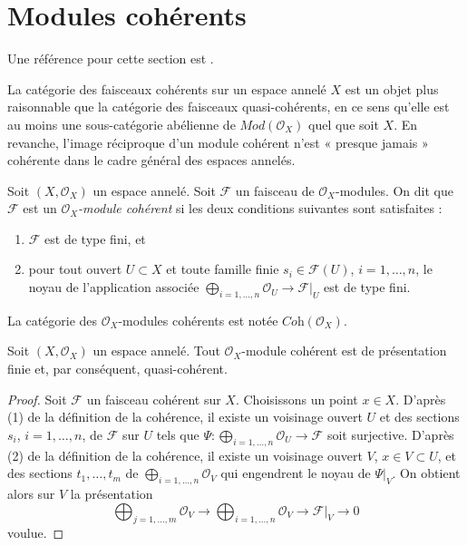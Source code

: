\section{Modules cohérents}
\label{section-coherent}

\noindent
Une référence pour cette section est \cite{FAC}.

\medskip\noindent
La catégorie des faisceaux cohérents sur un espace annelé $X$
est un objet plus raisonnable
que la catégorie des faisceaux quasi-cohérents, en ce sens
qu'elle est au moins une sous-catégorie abélienne de $\textit{Mod}(\mathcal{O}_X)$
quel que soit $X$. En revanche, l'image réciproque d'un
module cohérent n'est « presque jamais » cohérente dans le cadre général
des espaces annelés.

\begin{definition}
\label{definition-coherent}
Soit $(X, \mathcal{O}_X)$ un espace annelé.
Soit $\mathcal{F}$ un faisceau de $\mathcal{O}_X$-modules.
On dit que $\mathcal{F}$ est un {\it $\mathcal{O}_X$-module cohérent}
si les deux conditions suivantes sont satisfaites :
\begin{enumerate}
\item $\mathcal{F}$ est de type fini, et
\item pour tout ouvert $U \subset X$ et toute famille finie
$s_i \in \mathcal{F}(U)$, $i = 1, \ldots, n$,
le noyau de l'application associée
$\bigoplus_{i = 1, \ldots, n} \mathcal{O}_U \to \mathcal{F}|_U$
est de type fini.
\end{enumerate}
La catégorie des $\mathcal{O}_X$-modules cohérents est notée
$\textit{Coh}(\mathcal{O}_X)$.
\end{definition}

\begin{lemma}
\label{lemma-coherent-finite-presentation}
Soit $(X, \mathcal{O}_X)$ un espace annelé.
Tout $\mathcal{O}_X$-module cohérent est de présentation finie
et, par conséquent, quasi-cohérent.
\end{lemma}

\begin{proof}
Soit $\mathcal{F}$ un faisceau cohérent sur $X$.
Choisissons un point $x \in X$.
D'après (1) de la définition de la cohérence, il existe un voisinage ouvert $U$
et des sections $s_i$, $i = 1, \ldots, n$, de $\mathcal{F}$ sur $U$
tels que $\Psi : \bigoplus_{i = 1, \ldots, n} \mathcal{O}_U \to \mathcal{F}$
soit surjective. D'après (2) de la définition de la cohérence, il existe
un voisinage ouvert $V$, $x \in V \subset U$, et des sections
$t_1, \ldots, t_m$ de $\bigoplus_{i = 1, \ldots, n} \mathcal{O}_V$
qui engendrent le noyau de $\Psi|_V$. On obtient alors sur $V$ la
présentation
$$
\bigoplus\nolimits_{j = 1, \ldots, m}
\mathcal{O}_V
\longrightarrow
\bigoplus\nolimits_{i = 1, \ldots, n}
\mathcal{O}_V
\to
\mathcal{F}|_V
\to
0
$$
voulue.
\end{proof}

